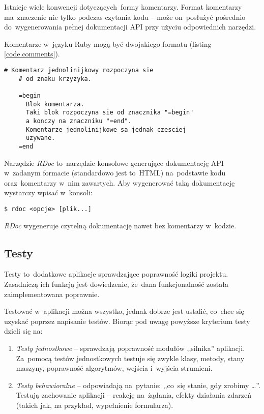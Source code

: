 Istnieje wiele konwencji dotyczących~formy komentarzy. Format komentarzy ma~znaczenie nie tylko podczas czytania kodu -- może on~posłużyć pośrednio do~wygenerowania pełnej dokumentacji API przy użyciu odpowiednich narzędzi.


Komentarze w~języku Ruby mogą być dwojakiego formatu (listing \ref{code.comments}).

  \begin{lstlisting}[label={code.comments}]
    # Komentarz jednolinijkowy rozpoczyna sie
    # od znaku krzyzyka.

    =begin
      Blok komentarza.
      Taki blok rozpoczyna sie od znacznika "=begin"
      a konczy na znaczniku "=end".
      Komentarze jednolinijkowe sa jednak czesciej
      uzywane.
    =end
  \end{lstlisting}


Narzędzie \textit{RDoc} \cite{rdoc} to~narzędzie konsolowe generujące dokumentację API w~zadanym formacie (standardowo jest to~HTML) na~podstawie kodu oraz~komentarzy w~nim zawartych. Aby wygenerować taką dokumentację wystarczy wpisać w~konsoli:

\mbox{\texttt{\$ rdoc <opcje> [plik...] }}

\textit{RDoc} wygeneruje czytelną dokumentację nawet bez komentarzy w~kodzie.

\subsection{Testy} \label{dokumentacja.testy}

Testy to~dodatkowe aplikacje sprawdzające poprawność logiki projektu. Zasadniczą ich funkcją jest dowiedzenie, że~dana funkcjonalność została zaimplementowana poprawnie.


Testować w~aplikacji można wszystko, jednak dobrze jest ustalić, co~chce się uzyskać poprzez napisanie testów. Biorąc pod uwagę powyższe kryterium testy dzieli się na:

\begin{enumerate}
 \item \textit{Testy jednostkowe} -- sprawdzają poprawność modułów ,,silnika'' aplikacji. Za~pomocą testów jednostkowych testuje się zwykle klasy, metody, stany maszyny, poprawność algorytmów, wejścia i~wyjścia strumieni.
 \item \textit{Testy behawioralne} -- odpowiadają na~pytanie: ,,co~się stanie, gdy zrobimy \ldots''. Testują zachowanie aplikacji -- reakcję na~żądania, efekty działania zdarzeń (takich jak, na przykład, wypełnienie formularza).
\end{enumerate}

